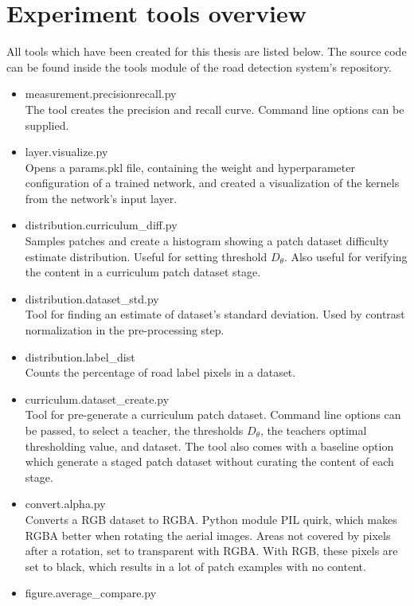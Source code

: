 \section{Experiment tools overview}
\label{app:tools}
All tools which have been created for this thesis are listed below. The source code can be found inside the tools module of the road detection system's repository.
\begin{itemize}
\item measurement.precisionrecall.py\\
The tool creates the precision and recall curve. Command line options can be supplied.
\item layer.visualize.py\\
Opens a params.pkl file, containing the weight and hyperparameter configuration of a trained network, and created a visualization of the kernels from the network's input layer.
\item distribution.curriculum\_diff.py\\
Samples patches and create a histogram showing a patch dataset difficulty estimate distribution. Useful for setting threshold $D_\theta$. Also useful for verifying the content in a curriculum patch dataset stage.
\item distribution.dataset\_std.py\\
Tool for finding an estimate of dataset's standard deviation. Used by contrast normalization in the pre-processing step.
\item distribution.label\_dist\\
Counts the percentage of road label pixels in a dataset.
\item curriculum.dataset\_create.py\\
Tool for pre-generate a curriculum patch dataset. Command line options can be passed, to select a teacher, the thresholds $D_\theta$, the teachers optimal thresholding value, and dataset. The tool also comes with a baseline option which generate a staged patch dataset without curating the content of each stage.
\item convert.alpha.py\\
Converts a RGB dataset to RGBA. Python module PIL quirk, which makes RGBA better when rotating the aerial images. Areas not covered by pixels after a rotation, set to transparent with RGBA. With RGB, these pixels are set to black, which results in a lot of patch examples with no content.
\item figure.average\_compare.py\\

\end{itemize}
